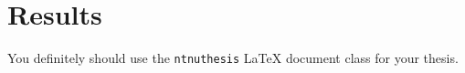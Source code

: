 \chapter{Results}

You definitely should use the \texttt{ntnuthesis} \LaTeX{} document class for your thesis.
